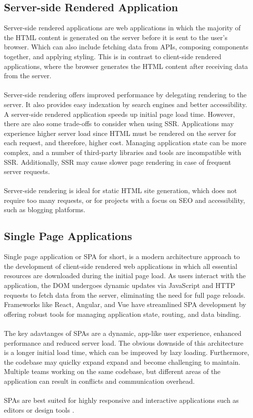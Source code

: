 \subsection{Server-side Rendered Application}
Server-side rendered applications are web applications in which the majority of the HTML content is generated on the server before it is sent to the user's browser. Which can also include fetching data from APIs, composing components together, and applying styling. This is in contrast to client-side rendered applications, where the browser generates the HTML content after receiving data from the server.\\\\
Server-side rendering offers improved performance by delegating rendering to the server. It also provides easy indexation by search engines and better accessibility. A server-side rendered application speeds up initial page load time. However, there are also some trade-offs to consider when using SSR. Applications may experience higher server load since HTML must be rendered on the server for each request, and therefore, higher cost. Managing application state can be more complex, and a number of third-party libraries and tools are incompatible with SSR. Additionally, SSR may cause slower page rendering in case of frequent server requests.\\\\
Server-side rendering is ideal for static HTML site generation, which does not require too many requests, or for projects with a focus on SEO and accessibility, such as blogging platforms.

\subsection{Single Page Applications}
Single page application or SPA for short, is a modern architecture approach to the development of client-side rendered web applications in which all essential resources are downloaded during the initial page load. As users interact with the application, the DOM undergoes dynamic updates via JavaScript and HTTP requests to fetch data from the server, eliminating the need for full page reloads.  Frameworks like React, Angular, and Vue have streamlined SPA development by offering robust tools for managing application state, routing, and data binding. \\\\
The key adavtanges of SPAs are a dynamic, app-like user experience, enhanced performance and reduced server load. The obvious downside of this architecture is a longer initial load time, which can be improved by lazy loading. Furthermore, the codebase may quiclky expand expand and become challenging to maintain. Multiple teams working on the same codebase, but different areas of the application can result in conflicts and communication overhead. \\\\
SPAs are best suited for highly responsive and interactive applications such as editors or design tools \cite{MFMotivations}.

